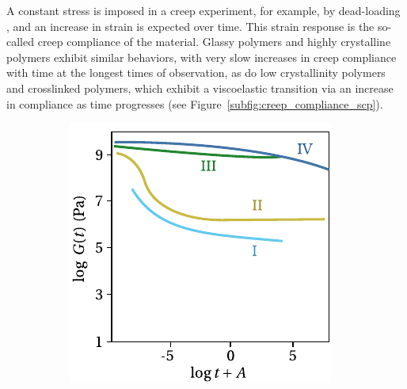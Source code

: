 A constant stress is imposed in a creep experiment, for example, by dead-loading \citep{wildingCreepRecoveryUltra1981}, and an increase in strain is expected over time.
This strain response is the so-called creep compliance of the material.
Glassy polymers and highly crystalline polymers exhibit similar behaviors, with very slow increases in creep compliance with time at the longest times of observation, as do low crystallinity polymers and crosslinked polymers, which exhibit a viscoelastic transition via an increase in compliance as time progresses \citep{ferryViscoelasticPropertiesPolymers1980} (see Figure~\ref{subfig:creep_compliance_scp}).
\begin{figure}[hbtp]
	\centering
	\begin{subfigure}[b]{0.45\textwidth}
							\centering
							\includegraphics[width=\textwidth]{figures/relax_modulus_scp}
							\caption{}
							\label{subfig:relax_modulus_scp}
			\end{subfigure} \hfill
			\begin{subfigure}[b]{0.45\textwidth}
							\centering

\end{subfigure}
\end{figure}
